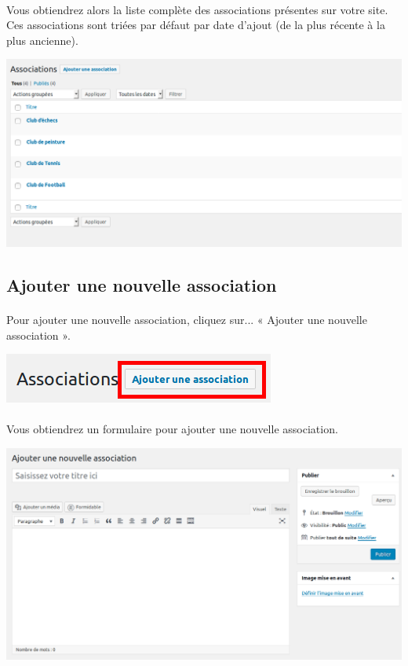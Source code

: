 \documentclass[10pt,a4paper]{article}
\begin{document}
\paragraph{}Vous obtiendrez alors la liste complète des associations présentes sur votre site. Ces associations sont triées par défaut par date d'ajout (de la plus récente à la plus ancienne).
\begin{center}
\includegraphics[scale=0.3]{img/0299.png}
\end{center}
\subsection{Ajouter une nouvelle association}
\paragraph{}Pour ajouter une nouvelle association, cliquez sur... « Ajouter une nouvelle association ».
\begin{center}
\includegraphics[scale=0.3]{img/0300.png}
\end{center}
\paragraph{}Vous obtiendrez un formulaire pour ajouter une nouvelle association.
\begin{center}
\includegraphics[scale=0.3]{img/0301.png}
\end{center}
\end{document}
